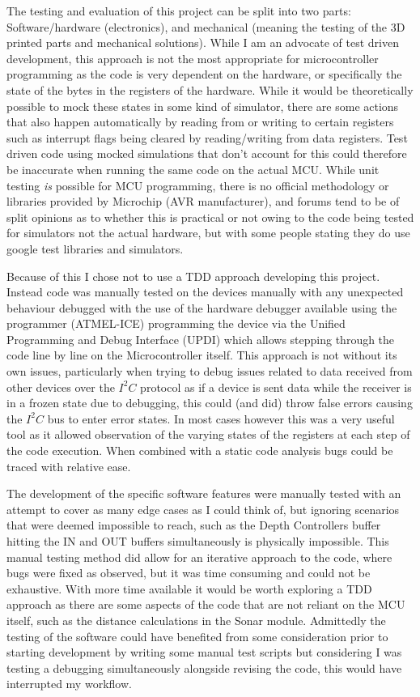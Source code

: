 \documentclass[11pt,a4paper,titlepage]{report}
\begin{document}
	The testing and evaluation of this project can be split into two parts: Software/hardware (electronics), and mechanical (meaning the testing of the 3D printed parts and mechanical solutions). While I am an advocate of test driven development, this approach is not the most appropriate for microcontroller programming as the code is very dependent on the hardware, or specifically the state of the bytes in the registers of the hardware. While it would be theoretically possible to mock these states in some kind of simulator, there are some actions that also happen automatically by reading from or writing to certain registers such as interrupt flags being cleared by reading/writing from data registers. Test driven code using mocked simulations that don't account for this could therefore be inaccurate when running the same code on the actual MCU. While unit testing \textit{is} possible for MCU programming, there is no official methodology or libraries provided by Microchip (AVR manufacturer), and forums\cite{UNIT_TEST_MC} tend to be of split opinions as to whether this is practical or not owing to the code being tested for simulators not the actual hardware, but with some people stating they do use google test libraries and simulators. 
	
	Because of this I chose not to use a TDD approach developing this project. Instead code was manually tested on the devices manually with any unexpected behaviour debugged with the use of the hardware debugger available using the programmer (ATMEL-ICE\cite{ATMEL_ICE}) programming the device via the Unified Programming and Debug Interface (UPDI) which allows stepping through the code line by line on the Microcontroller itself. This approach is not without its own issues, particularly when trying to debug issues related to data received from other devices over the $I^{2}C$ protocol as if a device is sent data while the receiver is in a frozen state due to debugging, this could (and did) throw false errors causing the $I^{2}C$ bus to enter error states. In most cases however this was a very useful tool as it allowed observation of the varying states of the registers at each step of the code execution. When combined with a static code analysis bugs could be traced with relative ease. 
	
	The development of the specific software features were manually tested with an attempt to cover as many edge cases as I could think of, but ignoring scenarios that were deemed impossible to reach, such as the Depth Controllers buffer hitting the IN and OUT buffers simultaneously is physically impossible. This manual testing method did allow for an iterative approach to the code, where bugs were fixed as observed, but it was time consuming and could not be exhaustive. With more time available it would be worth exploring a TDD approach as there are some aspects of the code that are not reliant on the MCU itself, such as the distance calculations in the Sonar module. Admittedly the testing of the software could have benefited from some consideration prior to starting development by writing some manual test scripts but considering I was testing a debugging simultaneously alongside revising the code, this would have interrupted my workflow.
	
\end{document}
